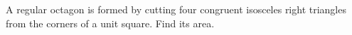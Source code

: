 A regular octagon is formed by cutting four congruent isosceles right triangles from the corners of a unit square. Find its area.

